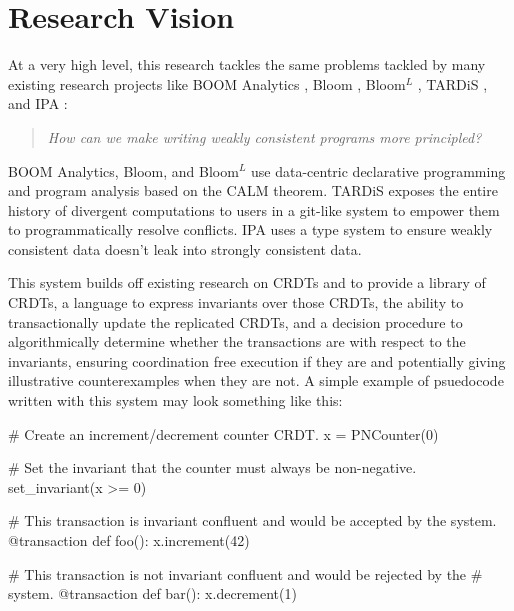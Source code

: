 \section{Research Vision}

At a very high level, this research tackles the same problems tackled by many
existing research projects like BOOM Analytics \cite{alvaro2010boom}, Bloom
\cite{alvaro2011consistency}, Bloom$^L$ \cite{conway2012logic}, TARDiS
\cite{crookstardis}, and IPA \cite{holt2016disciplined}:

\begin{quotation}
  \emph{How can we make writing weakly consistent programs more principled?}
\end{quotation}

BOOM Analytics, Bloom, and Bloom$^L$ use data-centric declarative programming
and program analysis based on the CALM theorem. TARDiS exposes the entire
history of divergent computations to users in a git-like system to empower them
to programmatically resolve conflicts. IPA uses a type system to ensure weakly
consistent data doesn't leak into strongly consistent data. 

This system builds off existing research on CRDTs and \iconfluence{} to provide
a library of CRDTs, a language to express invariants over those CRDTs, the
ability to transactionally update the replicated CRDTs, and a decision
procedure to algorithmically determine whether the transactions are
\iconfluent{} with respect to the invariants, ensuring coordination free
execution if they are and potentially giving illustrative counterexamples when
they are not. A simple example of psuedocode written with this system may look
something like this:

\begin{Python}
# Create an increment/decrement counter CRDT.
x = PNCounter(0)

# Set the invariant that the counter must always be non-negative.
set_invariant(x >= 0)

# This transaction is invariant confluent and would be accepted by the system.
@transaction
def foo():
  x.increment(42)

# This transaction is not invariant confluent and would be rejected by the
# system.
@transaction
def bar():
  x.decrement(1)
\end{Python}


